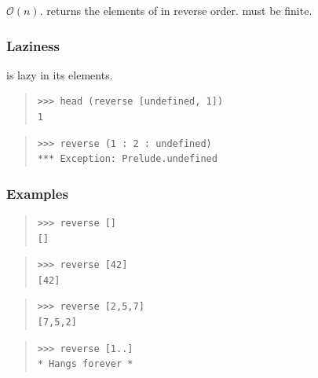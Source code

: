 \begin{haddockdesc}
\item[\begin{tabular}{@{}l}
reverse :: {\char 91}a{\char 93} -> {\char 91}a{\char 93}
\end{tabular}]
{\haddockbegindoc
\(\mathcal{O}(n)\).   returns the elements of  in reverse order.
  must be finite.\par
\subsubsection*{\textbf{Laziness}}
 is lazy in its elements.\par
\begin{quote}
{\haddockverb\begin{verbatim}
>>> head (reverse [undefined, 1])
1

\end{verbatim}}
\end{quote}
\begin{quote}
{\haddockverb\begin{verbatim}
>>> reverse (1 : 2 : undefined)
*** Exception: Prelude.undefined

\end{verbatim}}
\end{quote}
\subsubsection*{\textbf{Examples}}
\begin{quote}
{\haddockverb\begin{verbatim}
>>> reverse []
[]

\end{verbatim}}
\end{quote}
\begin{quote}
{\haddockverb\begin{verbatim}
>>> reverse [42]
[42]

\end{verbatim}}
\end{quote}
\begin{quote}
{\haddockverb\begin{verbatim}
>>> reverse [2,5,7]
[7,5,2]

\end{verbatim}}
\end{quote}
\begin{quote}
{\haddockverb\begin{verbatim}
>>> reverse [1..]
* Hangs forever *

\end{verbatim}}
\end{quote}}
\end{haddockdesc}
